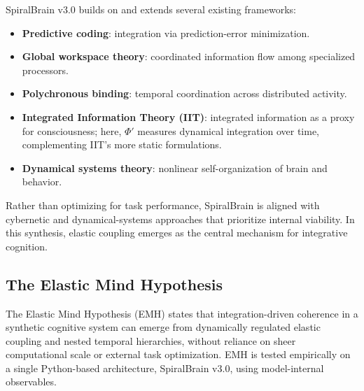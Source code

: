 \documentclass[11pt,a4paper]{article}
\begin{document}
SpiralBrain v3.0 builds on and extends several existing frameworks:
\begin{itemize}[leftmargin=2em]
    \item \textbf{Predictive coding}: integration via prediction-error minimization.
    \item \textbf{Global workspace theory}: coordinated information flow among specialized processors.
    \item \textbf{Polychronous binding}: temporal coordination across distributed activity.
    \item \textbf{Integrated Information Theory (IIT)}: integrated information as a proxy for consciousness; here, \( \Phi' \) measures dynamical integration over time, complementing IIT's more static formulations.
    \item \textbf{Dynamical systems theory}: nonlinear self-organization of brain and behavior.
\end{itemize}
Rather than optimizing for task performance, SpiralBrain is aligned with cybernetic and dynamical-systems approaches that prioritize internal viability. In this synthesis, elastic coupling emerges as the central mechanism for integrative cognition.

\subsection{The Elastic Mind Hypothesis}

The Elastic Mind Hypothesis (EMH) states that integration-driven coherence in a synthetic cognitive system can emerge from dynamically regulated elastic coupling and nested temporal hierarchies, without reliance on sheer computational scale or external task optimization. EMH is tested empirically on a single Python-based architecture, SpiralBrain v3.0, using model-internal observables.
\end{document}
